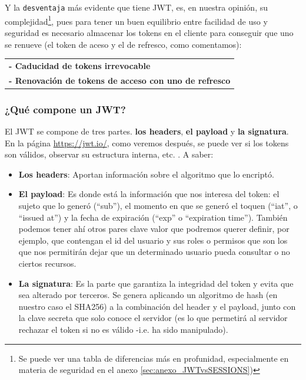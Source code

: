 \documentclass[a4paper,12pt]{report}
\begin{document}
				   \noindent Y la \texttt{desventaja} más evidente que tiene JWT, es, en nuestra opinión, su complejidad\footnote{Se puede ver una tabla de diferencias más en profunidad, especialmente en materia de seguridad en el anexo \ref{sec:anexo_JWTvsSESSIONS})}, pues para tener un buen equilibrio entre facilidad de uso y seguridad es necesario almacenar los tokens en el cliente para conseguir que uno se renueve (el token de aceso y el de refresco, como comentamos):
				  
				  \begin{tabular}{l}
					 \textbf{- Caducidad de tokens irrevocable}\\
					 \textbf{- Renovación de tokens de acceso con uno de refresco}
				  \end{tabular}
				 

				
				
				
				\subsubsection{¿Qué compone un JWT?}
				
				\noindent El JWT se compone de tres partes. \textbf{los headers}, \textbf{el payload} y \textbf{la signatura}. En la página \href{https://jwt.io/}{https://jwt.io/}, como veremos después, se puede ver si los tokens son válidos, observar su estructura interna, etc. \cite{jwtio}. A saber:
				

				\begin{itemize}
					\setlength{\itemsep}{-.5em}
					\item 				\textbf{Los headers}: Aportan información sobre el algoritmo que lo encriptó.
					\item 				\textbf{El payload}: Es donde está la información que nos interesa del token: el sujeto que lo generó (``sub''), el momento en que se generó el toquen (``iat'', o ``issued at'') y la fecha de expiración (``exp'' o ``expiration time''). También podemos tener ahí otros pares clave valor que podremos querer definir, por ejemplo, que contengan el id del usuario y sus roles o permisos que son los que nos permitirán dejar que un determinado usuario pueda consultar o no ciertos recursos.
					
					\item \textbf{La signatura}: Es la parte que garantiza la integridad del token y evita que sea alterado por terceros. Se genera aplicando un algoritmo de hash (en nuestro caso el SHA256) a la combinación del header y el payload, junto con la clave secreta que solo conoce el servidor (es lo que permetirá al servidor rechazar el token si no es válido -i.e. ha sido manipulado).
				\end{itemize}
				
\end{document}
